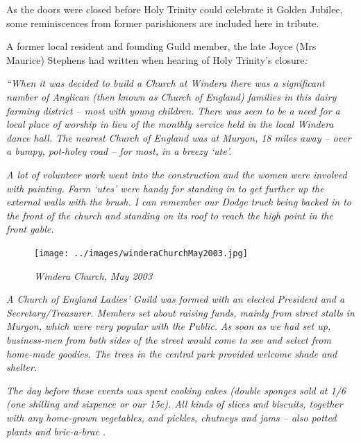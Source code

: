 As the doors were closed before Holy Trinity could celebrate it Golden Jubilee, some reminiscences from former parishioners are included here in tribute.



A former local resident and founding Guild member, the late Joyce (Mrs Maurice) Stephens had written when hearing of Holy Trinity's closure\emph{:}



\emph{``When it was decided to build a Church at Windera there was a significant number of Anglican (then known as Church of England) families in this dairy farming district -- most with young children. There was seen to be a need for a local place of worship in lieu of the monthly service held in the local Windera dance hall. The nearest Church of England was at Murgon, 18 miles away -- over a bumpy, pot-holey road -- for most, in a breezy `ute'.}



\emph{A lot of volunteer work went into the construction and the women were involved with painting. Farm `utes' were handy for standing in to get further up the external walls with the brush. I can remember our Dodge truck being backed in to the front of the church and standing on its roof to reach the high point in the front gable.}









\begin{figure}[!htb]
\begin{center}
\texttt{[image: ../images/winderaChurchMay2003.jpg]}
\caption{\itshape Windera Church, May 2003}
\end{center}
\end{figure}




\emph{A Church of England Ladies' Guild was formed with an elected President and a Secretary/Treasurer. Members set about raising funds, mainly from street stalls in Murgon, which were very popular with the Public.} \emph{As soon as we had set up, business-men from both sides of the street would come to see and select from home-made goodies. The trees in the central park provided welcome shade and shelter.}



\emph{The day before these events was spent cooking cakes (double sponges sold at 1/6 (one shilling and sixpence or our 15c). All kinds of slices and biscuits, together with any home-grown vegetables, and pickles, chutneys and jams -- also potted plants and bric-a-brac .}



